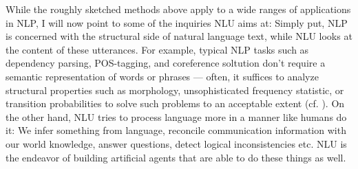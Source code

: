While the roughly sketched methods above apply to a wide ranges of applications in NLP,
I will now point to some of the inquiries NLU aims at: Simply put, NLP is concerned with
the structural side of natural language text, while NLU looks at the content of these
utterances. For example, typical NLP tasks such as dependency parsing, POS-tagging, and
coreference soltution don't require a semantic representation of words or phrases ---
often, it suffices to analyze structural properties such as morphology, unsophisticated
frequency statistic, or transition probabilities to solve such problems to an acceptable
extent (cf. \cite{kumawat2015pos}). On the other hand, NLU tries to process language more
in a manner like humans do it: We infer something from language, reconcile communication
information with our world knowledge, answer questions, detect logical inconsistencies
etc. NLU is the endeavor of building artificial agents that are able to do these things
as well.




